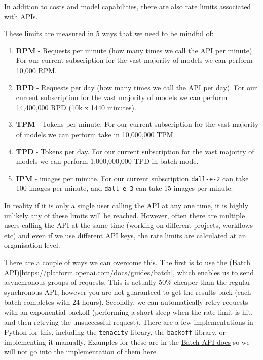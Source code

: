 \documentclass[
  letterpaper,
  DIV=11,
  numbers=noendperiod]{scrreprt}
\providecommand{\tightlist}{%
  \setlength{\itemsep}{0pt}\setlength{\parskip}{0pt}}\usepackage{longtable,booktabs,array}
\begin{document}
In addition to costs and model capabilities, there are also rate limits
associated with APIs.

These limits are measured in 5 ways that we need to be mindful of:

\begin{enumerate}
\def\labelenumi{\arabic{enumi}.}
\tightlist
\item
  \textbf{RPM} - Requests per minute (how many times we call the API per
  minute). For our current subscription for the vast majority of models
  we can perform 10,000 RPM.
\item
  \textbf{RPD} - Requests per day (how many times we call the API per
  day). For our current subscription for the vast majority of models we
  can perform 14,400,000 RPD (10k x 1440 minutes).
\item
  \textbf{TPM} - Tokens per minute. For our current subscription for the
  vast majority of models we can perform take in 10,000,000 TPM.
\item
  \textbf{TPD} - Tokens per day. For our current subscription for the
  vast majority of models we can perform 1,000,000,000 TPD in batch
  mode.
\item
  \textbf{IPM} - images per minute. For our current subscription
  \texttt{dall-e-2} can take 100 images per minute, and
  \texttt{dall-e-3} can take 15 images per minute.
\end{enumerate}

In reality if it is only a single user calling the API at any one time,
it is highly unlikely any of these limits will be reached. However,
often there are multiple users calling the API at the same time (working
on different projects, workflows etc) and even if we use different API
keys, the rate limits are calculated at an organisation level.

There are a couple of ways we can overcome this. The first is to use the
(Batch API){[}https://platform.openai.com/docs/guides/batch{]}, which
enables us to send asynchronous groups of requests. This is actually
50\% cheaper than the regular synchronous API, however you are not
guaranteed to get the results back (each batch completes with 24 hours).
Secondly, we can automatically retry requests with an exponential
backoff (performing a short sleep when the rate limit is hit, and then
retrying the unsuccessful request). There are a few implementations in
Python for this, including the \texttt{tenacity} library, the
\texttt{backoff} library, or implementing it manually. Examples for
these are in the
\href{https://platform.openai.com/docs/guides/rate-limits/retrying-with-exponential-backoff}{Batch
API docs} so we will not go into the implementation of them here.
\end{document}
